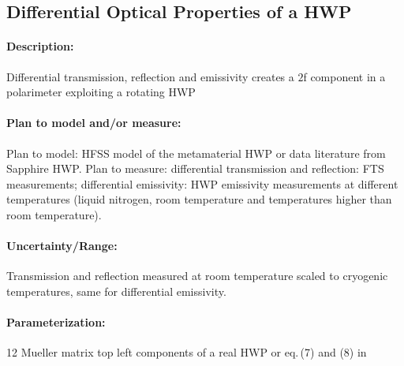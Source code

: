 \subsection{Differential Optical Properties of a HWP}

\paragraph{Description:}
Differential transmission, reflection and emissivity creates a $2$f component in a polarimeter exploiting a rotating HWP

\paragraph{Plan to model and/or measure:}
Plan to model: HFSS model of the metamaterial HWP or data literature from Sapphire HWP.
Plan to measure:
differential transmission and reflection: FTS measurements;
differential emissivity: HWP emissivity measurements at different temperatures
(liquid nitrogen, room temperature and temperatures higher than room temperature).

\paragraph{Uncertainty/Range:}
Transmission and reflection measured at room temperature scaled to cryogenic temperatures, same for differential emissivity.

\paragraph{Parameterization:}
12 Mueller matrix top left components of a real HWP or eq.$\,$(7) and (8) in %
